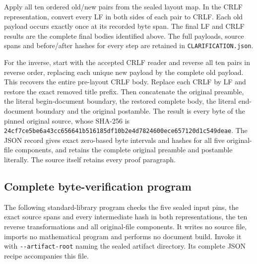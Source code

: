 \documentclass{article}
\begin{document}
Apply all ten ordered old/new pairs from the sealed layout map. In the
CRLF representation, convert every LF in both sides of each pair to CRLF.
Each old payload occurs exactly once at its recorded byte span. The final
LF and CRLF results are the complete final bodies identified above.
The full payloads, source spans and before/after hashes for every step are
retained in \nolinkurl{CLARIFICATION.json}.

For the inverse, start with the accepted CRLF reader and reverse all ten
pairs in reverse order, replacing each unique new payload by the complete
old payload. This recovers the entire pre-layout CRLF body. Replace each
CRLF by LF and restore the exact removed title prefix. Then concatenate
the original preamble, the literal begin-document boundary, the restored
complete body, the literal end-document boundary and the original
postamble. The result is every byte of the pinned original source,
whose SHA-256 is
\nolinkurl{24cf7ce5be6a43cc656641b516185df10b2e4d7824600ece657120d1c549deae}.
The JSON record gives exact zero-based byte intervals and hashes for all
five original-file components, and retains the complete original preamble
and postamble literally. The source itself retains every proof paragraph.

\subsection{Complete byte-verification program}
The following standard-library program checks the five sealed input pins,
the exact source spans and every intermediate hash in both representations,
the ten reverse transformations and all original-file components. It
writes no source file, imports no mathematical program and performs no
document build. Invoke it with \nolinkurl{--artifact-root} naming the
sealed artifact directory. Its complete JSON recipe accompanies this file.

\endgroup
\end{document}
